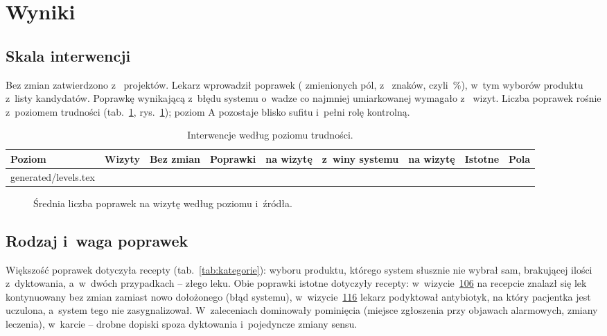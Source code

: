 \documentclass[11pt,a4paper]{article}
\makeatletter
\newcommand*{\tabinput}[1]{\@@input #1 }
\newcommand{\wizyta}[1]{\hyperref[wizyta:#1]{#1}}
\makeatother
\begin{document}
\section{Wyniki}

\subsection{Skala interwencji}
Bez zmian zatwierdzono \nDraftsUnchanged{} z~\nDrafts{} projektów. Lekarz wprowadził \nCorrections{} poprawek
(\nFieldsChanged{} zmienionych pól, \nCharsEdited{} z~\nDocChars{} znaków, czyli \pCharsEdited\,\%), w~tym \nProductChoices{}
wyborów produktu z~listy kandydatów. Poprawkę wynikającą z~błędu systemu o~wadze co najmniej umiarkowanej
wymagało \nVisitsSystemModerate{} z~\nVisits{} wizyt. Liczba poprawek rośnie z~poziomem trudności (tab.~\ref{tab:poziomy},
rys.~\ref{rys:poziomy}); poziom A pozostaje blisko sufitu i~pełni rolę kontrolną.

\begin{table}[ht]
\centering
\caption{Interwencje według poziomu trudności.}\label{tab:poziomy}
\small
\begin{tabular}{@{}l r r r r r r r r@{}}
\toprule
Poziom & Wizyty & Bez zmian & Poprawki & na wizytę & z~winy systemu & na wizytę & Istotne & Pola \\
\midrule
\tabinput{generated/levels.tex}
\bottomrule
\end{tabular}
\end{table}

\begin{figure}[ht]
\centering
{}
\caption{Średnia liczba poprawek na wizytę według poziomu i~źródła.}\label{rys:poziomy}
\end{figure}

\subsection{Rodzaj i~waga poprawek}
Większość poprawek dotyczyła recepty (tab.~\ref{tab:kategorie}): wyboru produktu, którego system słusznie nie wybrał sam,
brakującej ilości z~dyktowania, a~w~dwóch przypadkach -- złego leku. Obie poprawki istotne dotyczyły recepty:
w~wizycie~\wizyta{106} na recepcie znalazł się lek kontynuowany bez zmian zamiast nowo dołożonego (błąd systemu),
w~wizycie~\wizyta{116} lekarz podyktował antybiotyk, na który pacjentka jest uczulona, a~system tego nie zasygnalizował.
W~zaleceniach dominowały pominięcia (miejsce zgłoszenia przy objawach alarmowych, zmiany leczenia), w~karcie -- drobne
dopiski spoza dyktowania i~pojedyncze zmiany sensu.
\end{document}
